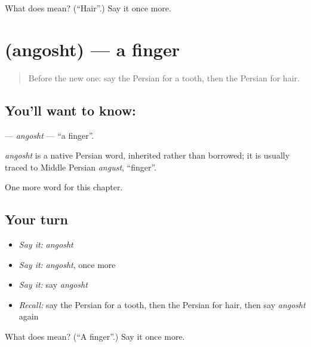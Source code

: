 \begin{tcolorbox}[breakable,colback=teal!4,colframe=teal!35!black,title={Before you move on}]
What does  mean? (\textquotedblleft{}Hair\textquotedblright{}.) Say it once more.
\end{tcolorbox}
\section[\texorpdfstring{\fa{انگشت} (angosht)}{انگشت (angosht)}]{ (angosht) — a finger}

\label{lesson:FA-C28-angosht}



\begin{quote}
Before the new one: say the Persian for a tooth, then the Persian for hair.
\end{quote}

\subsection*{You'll want to know: }
\textbf{} — \emph{angosht} — \textquotedblleft{}a finger\textquotedblright{}.

\begin{cousinweb}
\emph{angosht} is a native Persian word, inherited rather than borrowed; it is usually traced to Middle Persian \emph{angust}, \textquotedblleft{}finger\textquotedblright{}.
\end{cousinweb}

\begin{grammarlens}[title={What you've built}]
One more word for this chapter.
\end{grammarlens}

\subsection*{Your turn}
\begin{itemize}
\raggedright
  \item \emph{Say it:} \emph{angosht}
  \item \emph{Say it:} \emph{angosht}, once more
  \item \emph{Say it:} say \emph{angosht}
  \item \emph{Recall:} say the Persian for a tooth, then the Persian for hair, then say \emph{angosht} again
\end{itemize}

\begin{tcolorbox}[breakable,colback=teal!4,colframe=teal!35!black,title={Before you move on}]
What does  mean? (\textquotedblleft{}A finger\textquotedblright{}.) Say it once more.
\end{tcolorbox}
